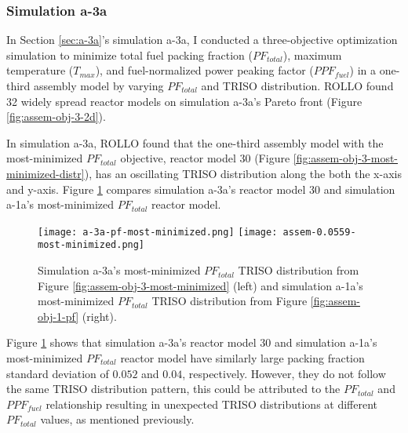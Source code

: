 \subsubsection{Simulation a-3a}
In Section \ref{sec:a-3a}'s simulation a-3a, I conducted a three-objective 
optimization simulation to minimize total fuel packing fraction ($PF_{total}$), 
maximum temperature ($T_{max}$), and fuel-normalized power peaking factor 
($PPF_{fuel}$) in a one-third assembly model by varying $PF_{total}$ and 
TRISO distribution.
\gls{ROLLO} found 32 widely spread reactor models on simulation a-3a's Pareto 
front (Figure \ref{fig:assem-obj-3-2d}). 

In simulation a-3a, \gls{ROLLO} found that the one-third assembly model with the 
most-minimized $PF_{total}$ objective, reactor model 30 (Figure 
\ref{fig:assem-obj-3-most-minimized-distr}), has an oscillating TRISO distribution 
along the both the x-axis and y-axis. 
Figure \ref{fig:a-3a-pf-triso-comparison} compares simulation a-3a's reactor model 30 and 
simulation a-1a's most-minimized $PF_{total}$ reactor model. 
\begin{figure}[htbp!]
    \centering
    \texttt{[image: a-3a-pf-most-minimized.png]} 
    \texttt{[image: assem-0.0559-most-minimized.png]} 
    \caption{Simulation a-3a's most-minimized $PF_{total}$ TRISO distribution 
    from Figure \ref{fig:assem-obj-3-most-minimized} (left) and simulation a-1a's 
    most-minimized $PF_{total}$ TRISO distribution from Figure 
    \ref{fig:assem-obj-1-pf} (right).}
    \label{fig:a-3a-pf-triso-comparison}
\end{figure}
Figure \ref{fig:a-3a-pf-triso-comparison} shows that simulation a-3a's reactor model 30 
and simulation a-1a's most-minimized $PF_{total}$ reactor model have similarly large 
packing fraction standard deviation of $0.052$ and $0.04$, respectively. 
However, they do not follow the same TRISO distribution pattern, this could be 
attributed to the $PF_{total}$ and $PPF_{fuel}$ relationship resulting in unexpected 
TRISO distributions at different $PF_{total}$ values, as mentioned previously. 

